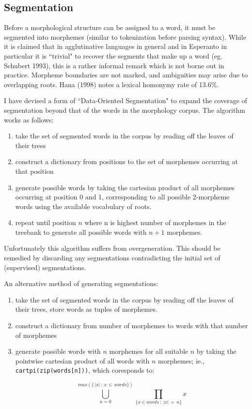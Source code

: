 \documentclass[10pt,a4paper]{article}
\begin{document}
\subsection{Segmentation}

Before a morphological structure can be assigned to a word, it must be
segmented into morphemes (similar to tokenization before parsing syntax). While
it is claimed that in agglutinative languages in general and in Esperanto in
particular it is ``trivial" to recover the segments that make up a word (eg.
Schubert 1993), this is a rather informal remark which is not borne out in
practice.  Morpheme boundaries are not marked, and ambiguities may arise due to
overlapping roots. Hana (1998) notes a lexical homonymy rate of 13.6\%.

I have devised a form of ``Data-Oriented Segmentation" to expand the
coverage of segmentation beyond that of the words in the morphology corpus. The
algorithm works as follows:

\begin{enumerate}
\item take the set of segmented words in the corpus by reading off the leaves
of their trees

\item construct a dictionary from positions to the set of morphemes occurring
at that position

\item generate possible words by taking the cartesian product of all morphemes
occurring at position 0 and 1, corresponding to all possible 2-morpheme words
using the available vocabulary of roots.

\item repeat until position $n$ where n is highest number of morphemes in the
treebank to generate all possible words with $n+1$ morphemes.

\end{enumerate}

Unfortunately this algorithm suffers from overgeneration. This should be
remedied by discarding any segmentations contradicting the initial set of
(supervised) segmentations. 

An alternative method of generating segmentations:

\begin{enumerate}
\item take the set of segmented words in the corpus by reading off the leaves
of their trees, store words as tuples of morphemes.

\item construct a dictionary from number of morphemes to words with that number
of morphemes

\item generate possible words with $n$ morphemes for all suitable $n$ by taking
the pointwise cartesian product of all words with $n$ morphemes; ie.,
\texttt{cartpi(zip(words[n]))}, which coresponds to:

\[ \displaystyle\bigcup_{n=0}^{ max(\{ \, \vert x \vert \, : \: x \, \in \, words\}) }\prod_{\{x \in words \: : \: \vert x\vert \, = \, n\}} x \]

\end{enumerate}
\end{document}
